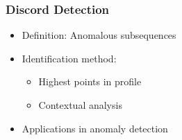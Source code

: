 \begin{frame}[fragile]\frametitle{Discord Detection}
    \begin{itemize}
        \item Definition: Anomalous subsequences
        \item Identification method:
            \begin{itemize}
                \item Highest points in profile
                \item Contextual analysis
            \end{itemize}
        \item Applications in anomaly detection
    \end{itemize}
\end{frame}